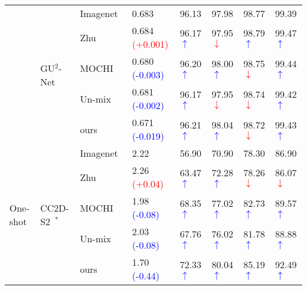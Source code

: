 \documentclass[10pt,twocolumn,letterpaper]{article}
\begin{document}
\begin{table*}[t]
\begin{threeparttable}
\begin{tabular}{l|l|l|lllll}
 \cline{2-8}
 & \multirow{5}{*}{GU$^2$-Net~\cite{zhu2021you}} & Imagenet~\cite{DBLP:conf/cvpr/DengDSLL009} & 0.683 & 96.13 & 97.98 & 98.77 & 99.39\\
 & & Zhu~\cite{zhu2021improving} & 0.684 \textcolor{red}{(+0.001)} & 96.17\textcolor{blue}{$\uparrow$} & 97.95\textcolor{red}{$\downarrow$} & 98.79\textcolor{blue}{$\uparrow$} & 99.47\textcolor{blue}{$\uparrow$}\\
 & & MOCHI~\cite{kalantidis2020hard} & 0.680 \textcolor{blue}{(-0.003)} & 96.20\textcolor{blue}{$\uparrow$} & 98.00\textcolor{blue}{$\uparrow$} & 98.75\textcolor{red}{$\downarrow$} & 99.44\textcolor{blue}{$\uparrow$}\\
 & & Un-mix~\cite{shen2022mix} & 0.681 \textcolor{blue}{(-0.002)} & 96.17\textcolor{blue}{$\uparrow$} & 97.95\textcolor{red}{$\downarrow$} & 98.74\textcolor{red}{$\downarrow$} & 99.42\textcolor{blue}{$\uparrow$}\\
 & & ours & 0.671 \textcolor{blue}{(-0.019)} & 96.21\textcolor{blue}{$\uparrow$} & 98.04\textcolor{blue}{$\uparrow$} & 98.72\textcolor{red}{$\downarrow$} & 99.43\textcolor{blue}{$\uparrow$}\\
 \cline{1-8}
 \multirow{5}{*}{One-shot}& \multirow{5}{*}{CC2D-S2~\cite{yao2021one}$^*$} & Imagenet~\cite{DBLP:conf/cvpr/DengDSLL009} & 2.22 & 56.90 & 70.90 & 78.30 & 86.90 \\
 & & Zhu~\cite{zhu2021improving}  & 2.26 \textcolor{red}{(+0.04)} & 63.47\textcolor{blue}{$\uparrow$} & 72.28\textcolor{blue}{$\uparrow$} & 78.26\textcolor{red}{$\downarrow$} & 86.07\textcolor{red}{$\downarrow$}\\
 & & MOCHI~\cite{kalantidis2020hard}  & 1.98 \textcolor{blue}{(-0.08)} & 68.35\textcolor{blue}{$\uparrow$} & 77.02\textcolor{blue}{$\uparrow$} & 82.73\textcolor{blue}{$\uparrow$} & 89.57\textcolor{blue}{$\uparrow$} \\
 & & Un-mix~\cite{shen2022mix} & 2.03 \textcolor{blue}{(-0.08)} & 67.76\textcolor{blue}{$\uparrow$} & 76.02\textcolor{blue}{$\uparrow$} & 81.78\textcolor{blue}{$\uparrow$} & 88.88\textcolor{blue}{$\uparrow$} \\
& & ours  & 1.70 \textcolor{blue}{(-0.44)} & 72.33\textcolor{blue}{$\uparrow$} & 80.04\textcolor{blue}{$\uparrow$} & 85.19\textcolor{blue}{$\uparrow$} & 92.49\textcolor{blue}{$\uparrow$} \\

\end{tabular}
\end{threeparttable}
\end{table*}
\end{document}
